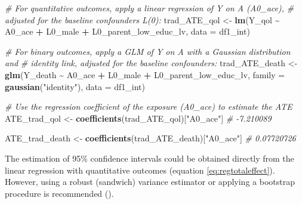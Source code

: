 \documentclass[
]{book}
\newenvironment{Shaded}{\begin{snugshade}}{\end{snugshade}}
\newcommand{\AttributeTok}[1]{\textcolor[rgb]{0.13,0.29,0.53}{#1}}
\newcommand{\CommentTok}[1]{\textcolor[rgb]{0.56,0.35,0.01}{\textit{#1}}}
\newcommand{\FunctionTok}[1]{\textcolor[rgb]{0.13,0.29,0.53}{\textbf{#1}}}
\newcommand{\NormalTok}[1]{#1}
\newcommand{\OtherTok}[1]{\textcolor[rgb]{0.56,0.35,0.01}{#1}}
\newcommand{\SpecialCharTok}[1]{\textcolor[rgb]{0.81,0.36,0.00}{\textbf{#1}}}
\newcommand{\StringTok}[1]{\textcolor[rgb]{0.31,0.60,0.02}{#1}}
\begin{document}
\begin{Shaded}
\begin{Highlighting}[]
\CommentTok{\# For quantitative outcomes, apply a linear regression of Y on A (A0\_ace), }
\CommentTok{\# adjusted for the baseline confounders L(0):}
\NormalTok{trad\_ATE\_qol }\OtherTok{\textless{}{-}} \FunctionTok{lm}\NormalTok{(Y\_qol }\SpecialCharTok{\textasciitilde{}}\NormalTok{ A0\_ace }\SpecialCharTok{+}\NormalTok{ L0\_male }\SpecialCharTok{+}\NormalTok{ L0\_parent\_low\_educ\_lv,}
                   \AttributeTok{data =}\NormalTok{ df1\_int)}

\CommentTok{\# For binary outcomes, apply a GLM of Y on A with a Gaussian distribution and}
\CommentTok{\# identity link, adjusted for the baseline confounders:}
\NormalTok{trad\_ATE\_death }\OtherTok{\textless{}{-}} \FunctionTok{glm}\NormalTok{(Y\_death }\SpecialCharTok{\textasciitilde{}}\NormalTok{ A0\_ace }\SpecialCharTok{+}\NormalTok{ L0\_male }\SpecialCharTok{+}\NormalTok{ L0\_parent\_low\_educ\_lv,}
                      \AttributeTok{family =} \FunctionTok{gaussian}\NormalTok{(}\StringTok{"identity"}\NormalTok{),}
                      \AttributeTok{data =}\NormalTok{ df1\_int)}

\CommentTok{\# Use the regression coefficient of the exposure (A0\_ace) to estimate the ATE}
\NormalTok{ATE\_trad\_qol }\OtherTok{\textless{}{-}} \FunctionTok{coefficients}\NormalTok{(trad\_ATE\_qol)[}\StringTok{"A0\_ace"}\NormalTok{]}
\CommentTok{\# {-}7.210089}

\NormalTok{ATE\_trad\_death }\OtherTok{\textless{}{-}} \FunctionTok{coefficients}\NormalTok{(trad\_ATE\_death)[}\StringTok{"A0\_ace"}\NormalTok{]}
\CommentTok{\# 0.07720726}
\end{Highlighting}
\end{Shaded}

The estimation of 95\% confidence intervals could be obtained directly from the linear regression with quantitative outcomes (equation \eqref{eq:regtotaleffect}). However, using a robust (sandwich) variance estimator or applying a bootstrap procedure is recommended ().
\end{document}

